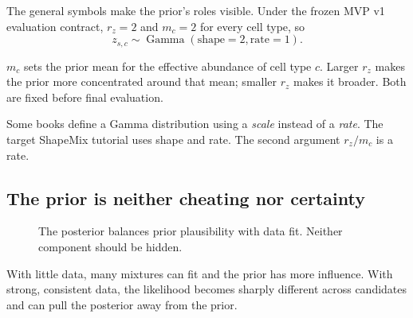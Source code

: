 \documentclass[11pt]{article}
\newcommand{\Gam}{\operatorname{Gamma}}
\begin{document}
The general symbols make the prior's roles visible. Under the frozen MVP v1
evaluation contract, \(r_z=2\) and \(m_c=2\) for every cell type, so
\[
z_{s,c}\sim\Gam(\text{shape}=2,\text{rate}=1).
\]

\begin{translation}
\(m_c\) sets the prior mean for the effective abundance of cell type \(c\).
Larger \(r_z\) makes the prior more concentrated around that mean; smaller \(r_z\)
makes it broader. Both are fixed before final evaluation.
\end{translation}

\begin{watchout}
Some books define a Gamma distribution using a \emph{scale} instead of a
\emph{rate}. The target ShapeMix tutorial uses shape and rate. The second argument
\(r_z/m_c\) is a rate.
\end{watchout}

\subsection{The prior is neither cheating nor certainty}

\begin{figure}[H]
\centering
{}
\caption{The posterior balances prior plausibility with data fit. Neither component should be hidden.}
\end{figure}

With little data, many mixtures can fit and the prior has more influence. With
strong, consistent data, the likelihood becomes sharply different across
candidates and can pull the posterior away from the prior.
\end{document}
